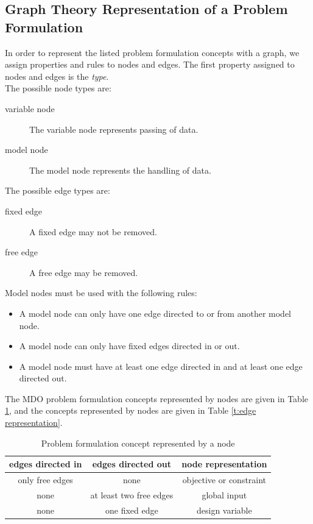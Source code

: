 \subsection{Graph Theory Representation of a Problem Formulation}
In order to represent the listed problem formulation concepts with a graph, we assign properties and rules to nodes and edges.
The first property assigned to nodes and edges is the \emph{type}. \\
The possible node types are:
\begin{description}
\item[variable node] The variable node represents passing of data.
\item[model node] The model node represents the handling of data.
\end{description}
The possible edge types are:
\begin{description}
\item[fixed edge] A fixed edge may not be removed.
\item[free edge] A free edge may be removed.
\end{description}
Model nodes must be used with the following rules:
\begin{itemize}
\item A model node can only have one edge directed to or from another model node.
\item A model node can only have fixed edges directed in or out.
\item A model node must have at least one edge directed in and at least one edge directed out.
\end{itemize}
The MDO problem formulation concepts represented by nodes are given in Table \ref{t:node representation}, and the concepts represented by nodes are given in Table \ref{t:edge representation}.
\begin{table}[h!]
 \begin{center}
  \caption{Problem formulation concept represented by a node}
  \label{t:node representation}
  \begin{tabular}{ccc} \hline 
edges directed in & edges directed out & node representation \\ \hline
only free edges & none & objective or constraint\\
none & at least two free edges & global input \\
none & one fixed edge & design variable \\ \hline
  \end{tabular}
 \end{center}
 \vspace{-15pt}
\end{table}
